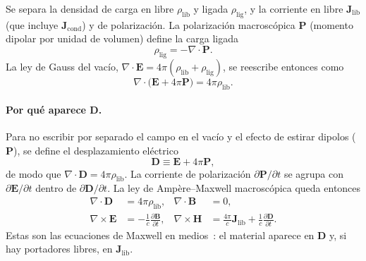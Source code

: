Se separa la densidad de carga en libre $\rho_{\mathrm{lib}}$ y ligada $\rho_{\mathrm{lig}}$,
y la corriente en libre $\mathbf{J}_{\mathrm{lib}}$ (que incluye $\mathbf{J}_{\mathrm{cond}}$) y de polarizaci\'on.
La polarizaci\'on macrosc\'opica $\mathbf{P}$ (momento dipolar por unidad de volumen) define la carga ligada
\begin{equation}
\rho_{\mathrm{lig}}=-\nabla\cdot\mathbf{P}.
\end{equation}
La ley de Gauss del vac\'io, $\nabla\cdot\mathbf{E}=4\pi(\rho_{\mathrm{lib}}+\rho_{\mathrm{lig}})$,
se reescribe entonces como
\begin{equation}
\nabla\cdot\bigl(\mathbf{E}+4\pi\mathbf{P}\bigr)=4\pi\rho_{\mathrm{lib}}.
\end{equation}

\paragraph{Por qu\'e aparece $\mathbf{D}$.}
Para no escribir por separado el campo en el vac\'io y el efecto de estirar dipolos ($\mathbf{P}$), se define el desplazamiento el\'ectrico
\begin{equation}
\label{eq:D-def}
\mathbf{D}\equiv\mathbf{E}+4\pi\mathbf{P},
\end{equation}
de modo que $\nabla\cdot\mathbf{D}=4\pi\rho_{\mathrm{lib}}$.
La corriente de polarizaci\'on $\partial\mathbf{P}/\partial t$ se agrupa con $\partial\mathbf{E}/\partial t$ dentro de $\partial\mathbf{D}/\partial t$.
La ley de Amp\`ere--Maxwell macrosc\'opica queda entonces
\begin{align}
\label{eq:maxwell-medios}
\nabla\cdot\mathbf{D}&=4\pi\rho_{\mathrm{lib}},&
\nabla\cdot\mathbf{B}&=0,\\
\nabla\times\mathbf{E}&=-\frac{1}{c}\frac{\partial\mathbf{B}}{\partial t},&
\nabla\times\mathbf{H}&=\frac{4\pi}{c}\mathbf{J}_{\mathrm{lib}}
+\frac{1}{c}\frac{\partial\mathbf{D}}{\partial t}.
\end{align}
Estas son las ecuaciones de Maxwell en medios~\cite{Jackson}:
el material aparece en $\mathbf{D}$ y, si hay portadores libres, en $\mathbf{J}_{\mathrm{lib}}$.

